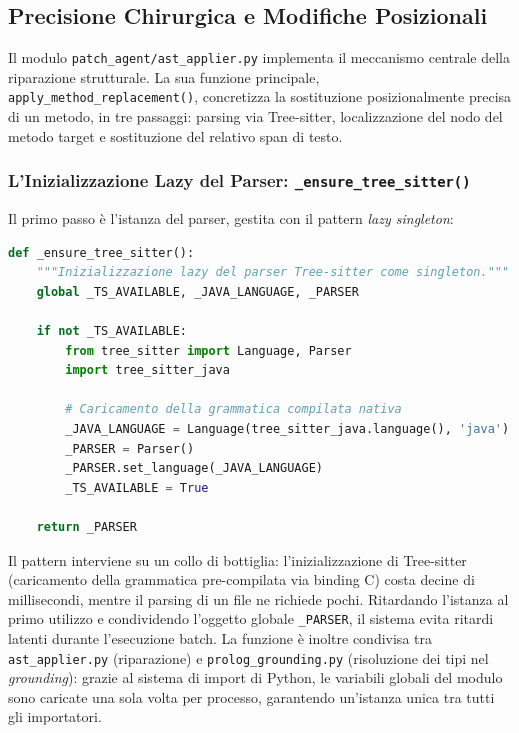 \subsection{Precisione Chirurgica e Modifiche Posizionali}
\label{subsec:3.4.6}
Il modulo \texttt{patch\_agent/ast\_applier.py} implementa il meccanismo centrale della riparazione strutturale. La
sua funzione principale, \texttt{apply\_method\_replacement()}, concretizza la sostituzione posizionalmente precisa
di un metodo, in tre passaggi: parsing via Tree-sitter, localizzazione del nodo del metodo target e sostituzione
del relativo span di testo.

\subsubsection{L'Inizializzazione Lazy del Parser: \texttt{\_ensure\_tree\_sitter()}}
\label{subsubsec:3.4.6.1}
Il primo passo è l'istanza del parser, gestita con il pattern \textit{lazy singleton}:

\begin{lstlisting}[language=Python, label={lst:ensure_tree_sitter}]
def _ensure_tree_sitter():
    """Inizializzazione lazy del parser Tree-sitter come singleton."""
    global _TS_AVAILABLE, _JAVA_LANGUAGE, _PARSER

    if not _TS_AVAILABLE:
        from tree_sitter import Language, Parser
        import tree_sitter_java

        # Caricamento della grammatica compilata nativa
        _JAVA_LANGUAGE = Language(tree_sitter_java.language(), 'java')
        _PARSER = Parser()
        _PARSER.set_language(_JAVA_LANGUAGE)
        _TS_AVAILABLE = True

    return _PARSER
\end{lstlisting}

Il pattern interviene su un collo di bottiglia: l'inizializzazione di Tree-sitter (caricamento della grammatica
pre-compilata via binding C) costa decine di millisecondi, mentre il parsing di un file ne richiede pochi.
Ritardando l'istanza al primo utilizzo e condividendo l'oggetto globale \texttt{\_PARSER}, il sistema evita ritardi
latenti durante l'esecuzione batch. La funzione è inoltre condivisa tra \texttt{ast\_applier.py} (riparazione) e
\texttt{prolog\_grounding.py} (risoluzione dei tipi nel \textit{grounding}): grazie al sistema di import di Python,
le variabili globali del modulo sono caricate una sola volta per processo, garantendo un'istanza unica tra tutti
gli importatori.

